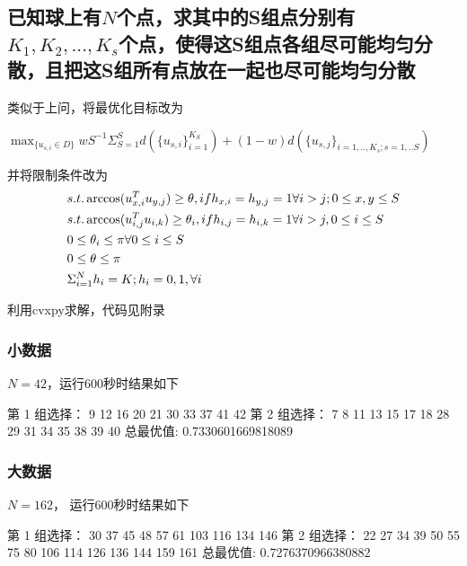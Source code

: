 \subsection{已知球上有$N$个点，求其中的S组点分别有$K_1,K_2,...,K_s$个点，使得这S组点各组尽可能均匀分散，且把这S组所有点放在一起也尽可能均匀分散}
类似于上问，将最优化目标改为

$\max_{\{u_{s,i} \in D \}} wS^{-1} \Sigma ^ S_{S=1}d(\{u_{s,i}\}^{K_S}_{i=1}) + (1-w)d (\{u_{s,j}\}_{i=1,..,K_s;s=1,..S})$

并将限制条件改为
\begin{equation}
    \begin{aligned}
        &s.t. \space \arccos(u_{x,i}^Tu_{y,j}) \ge \theta, if \space h_{x,i}=h_{y,j}=1 \space \forall i > j; 0 \le x,y \le S\\      
        &s.t. \space \arccos(u_{i,j}^Tu_{i,k}) \ge \theta_i, if \space h_{i,j}=h_{i,k}=1 \space \forall i > j, 0 \le i \le S\\
        &0 \le \theta_i \le \pi \space \forall 0 \le i \le S\\
        &0 \le \theta \le \pi\\
        & \Sigma^{N}_{i=1} h_i = K; h_i = 0,1 , \forall i
    \end{aligned}
\end{equation}

利用cvxpy求解，代码见附录

\subsubsection{小数据}
$N=42$，运行600秒时结果如下

\begin{python}
第 1 组选择：
9  12  16  20  21  30  33  37  41  42  
第 2 组选择：
7  8  11  13  15  17  18  28  29  31  34  35  38  39  40  
总最优值: 0.7330601669818089

\end{python}
\subsubsection{大数据}
$N=162$， 运行600秒时结果如下
\begin{python}
第 1 组选择：
30  37  45  48  57  61  103  116  134  146  
第 2 组选择：
22  27  34  39  50  55  75  80  106  114  126  136  144  159  161  
总最优值: 0.7276370966380882
\end{python}